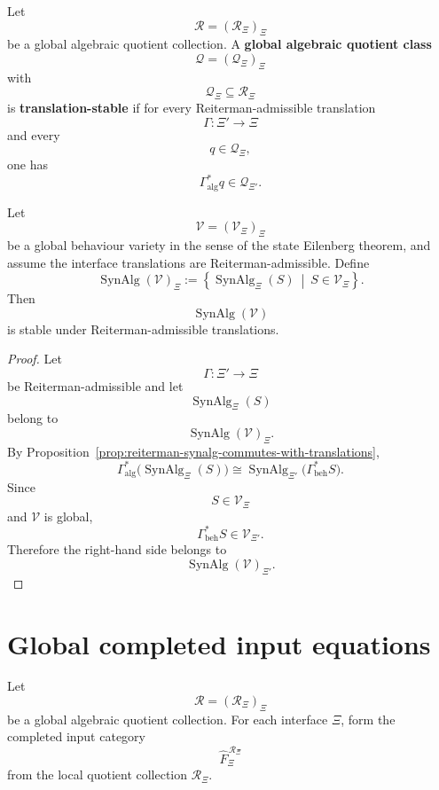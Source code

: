 \begin{definition}
\label{def:reiterman-global-algebraic-quotient-class}
Let
\[
\mathcal R=(\mathcal R_\Xi)_\Xi
\]
be a global algebraic quotient collection. A \textbf{global algebraic
quotient class}
\[
\mathcal Q=(\mathcal Q_\Xi)_\Xi
\]
with
\[
\mathcal Q_\Xi\subseteq\mathcal R_\Xi
\]
is \textbf{translation-stable} if for every Reiterman-admissible translation
\[
\Gamma:\Xi'\to\Xi
\]
and every
\[
q\in\mathcal Q_\Xi,
\]
one has
\[
\Gamma_{\mathrm{alg}}^\ast q\in\mathcal Q_{\Xi'}.
\]
\end{definition}

\begin{proposition}
\label{prop:reiterman-syntactic-quotients-global-varieties}
Let
\[
\mathcal V=(\mathcal V_\Xi)_\Xi
\]
be a global behaviour variety in the sense of the state Eilenberg theorem,
and assume the interface translations are Reiterman-admissible. Define
\[
\operatorname{SynAlg}(\mathcal V)_\Xi
:=
\left\{
\operatorname{SynAlg}_{\Xi}(S)
\ \middle|\
S\in\mathcal V_\Xi
\right\}.
\]
Then
\[
\operatorname{SynAlg}(\mathcal V)
\]
is stable under Reiterman-admissible translations.
\end{proposition}

\begin{proof}
Let
\[
\Gamma:\Xi'\to\Xi
\]
be Reiterman-admissible and let
\[
\operatorname{SynAlg}_{\Xi}(S)
\]
belong to
\[
\operatorname{SynAlg}(\mathcal V)_\Xi.
\]
By Proposition~\ref{prop:reiterman-synalg-commutes-with-translations},
\[
\Gamma_{\mathrm{alg}}^\ast
\bigl(
\operatorname{SynAlg}_{\Xi}(S)
\bigr)
\cong
\operatorname{SynAlg}_{\Xi'}
\bigl(
\Gamma_{\mathrm{beh}}^\ast S
\bigr).
\]
Since
\[
S\in\mathcal V_\Xi
\]
and \(\mathcal V\) is global,
\[
\Gamma_{\mathrm{beh}}^\ast S\in\mathcal V_{\Xi'}.
\]
Therefore the right-hand side belongs to
\[
\operatorname{SynAlg}(\mathcal V)_{\Xi'}.
\]
\end{proof}

\section{Global completed input equations}
\label{sec:reiterman-global-completed-input-equations}

Let
\[
\mathcal R=(\mathcal R_\Xi)_\Xi
\]
be a global algebraic quotient collection. For each interface \(\Xi\), form
the completed input category
\[
\widehat F_\Xi^{\,\mathcal R_\Xi}
\]
from the local quotient collection \(\mathcal R_\Xi\).


